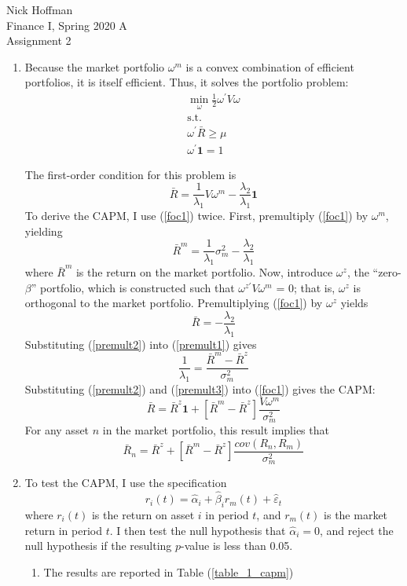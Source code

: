 \documentclass[11pt]{article}
\newcommand{\w}{\omega}
\newcommand{\p}{\prime}
\newcommand{\one}{\mathbf{1}}
\begin{document}
\begin{flushleft}
	Nick Hoffman \\
	Finance I, Spring 2020 A \\
	Assignment 2 \\
\end{flushleft}

\begin{enumerate}
	\item Because the market portfolio $ \w^m $ is a convex combination of efficient portfolios, it is itself efficient. Thus, it solves the portfolio problem:
	\begin{gather*}
	\min_\w \frac{1}{2}\w^\p V \w \\
	\text{s.t.} \\
	\w^\p \bar{R} \geq \mu \\
	\w^\p \one = 1
	\end{gather*}
	
	The first-order condition for this problem is 
	\begin{equation}\label{foc1}
	\bar{R} = \frac{1}{\lambda_1} V \w^m - \frac{\lambda_2}{\lambda_1} \one 
	\end{equation}
	To derive the CAPM, I use (\ref{foc1}) twice. First, premultiply (\ref{foc1}) by $ \w^m $, yielding
	\begin{equation}\label{premult1}
	\bar{R}^m = \frac{1}{\lambda_1} \sigma^2_m - \frac{\lambda_2}{\lambda_1}
	\end{equation}
	where $\bar{R}^m$ is the return on the market portfolio. Now, introduce $ \w^z $, the ``zero-$ \beta $'' portfolio, which is constructed such that $ \w^{z\p}V \w^m  $ = 0; that is, $ \w^z $ is orthogonal to the market portfolio. Premultiplying (\ref{foc1}) by $ \w^z $ yields
	\begin{equation}\label{premult2}
	\bar{R} = -\frac{\lambda_2}{\lambda_1} 
	\end{equation}
	Substituting (\ref{premult2}) into (\ref{premult1}) gives
	\begin{equation}\label{premult3}
	\frac{1}{\lambda_1} = \frac{\bar{R}^m - \bar{R}^z}{\sigma_m^2}
	\end{equation}
	Substituting (\ref{premult2}) and (\ref{premult3}) into (\ref{foc1}) gives the CAPM:
	\[\bar{R} = \bar{R}^z \one + [\bar{R}^m - \bar{R}^z]\frac{V\w^m}{\sigma_m^2}\]
	For any asset $ n $ in the market portfolio, this result implies that
	\[\bar{R}_n = \bar{R}^z  + [\bar{R}^m - \bar{R}^z]\frac{cov(R_n, R_m)}{\sigma_m^2}\]
	
	\item To test the CAPM, I use the specification 
	\[r_i(t) = \hat{\alpha}_i + \hat{\beta}_i r_m(t) + \hat{\varepsilon}_t\]
	where $ r_i(t) $ is the return on asset $ i $ in period $ t $, and $ r_m(t) $ is the market return in period $ t $. I then test the null hypothesis that $ \hat{\alpha}_i = 0 $, and reject the null hypothesis if the resulting $ p $-value is less than 0.05. 
	\begin{enumerate}
		\item The results are reported in Table (\ref{table_1_capm}) \newpage
		

\end{enumerate}
\end{enumerate}
\end{document}
